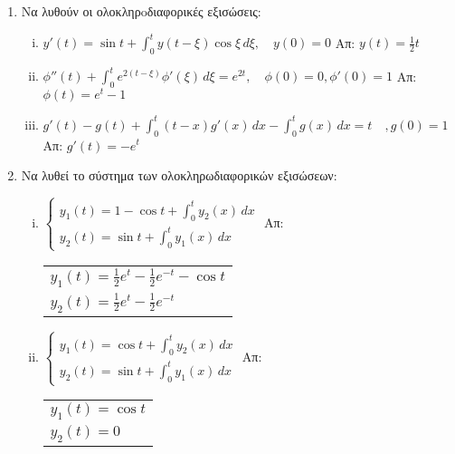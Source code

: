


\everymath{\displaystyle}
\pagestyle{askhseis}





\begin{center}
  \minibox{\large\bfseries \textcolor{Col1}{Ασκήσεις Στo Μετασχηματισμό Laplace}}
\end{center}

\vspace{\baselineskip}

\begin{enumerate}
\item Να λυθούν οι ολοκληρoδιαφορικές εξισώσεις:
\begin{enumerate}[i)]

\item $y'(t)=\sin t+\int_{0}^{t}y(t-\xi)\cos\xi\, d\xi,\quad y(0)=0$ \hfill Απ: $y(t)=\frac{1}{2}t$
\item $\phi''(t)+\int_{0}^{t}e^{2(t-\xi)}\phi'(\xi)\,d\xi=e^{2t},\quad \phi(0)=0, \phi'(0)=1$ \hfill Απ: $\phi(t)=e^t-1$
\item $g'(t)-g(t)+\int_{0}^{t}(t-x)g'(x)\,dx - \int_{0}^{t}g(x)\,dx = t \quad, g(0)=1$\hfill Απ: $g'(t)=-e^t$

\end{enumerate}

\item Να λυθεί το σύστημα των ολοκληρωδιαφορικών εξισώσεων:

\begin{enumerate}[i)]

\item $\begin{cases}
y_1(t)=1-\cos t+\int_{0}^{t}y_2(x)\,dx \\
y_2(t)=\sin t+\int_{0}^{t}y_1(x)\,dx
\end{cases}$ \hfill Απ: \begin{tabular}[t]{l}$y_1(t)=\frac{1}{2}e^t-\frac{1}{2}e^{-t}-\cos t$ \\
$y_2(t)=\frac{1}{2}e^t-\frac{1}{2}e^{-t}$
\end{tabular}

\vspace{\baselineskip}

\item $\begin{cases}
y_1(t)=\cos t +\int_{0}^{t}y_2(x)\,dx \\
y_2(t)=\sin t +\int_{0}^{t}y_1(x)\,dx
\end{cases}$ \hfill Απ: \begin{tabular}[t]{l}$y_1(t)=\cos t$ \\
$y_2(t)=0$
\end{tabular}


\end{enumerate}
\end{enumerate}
